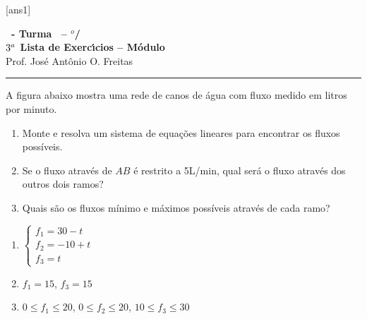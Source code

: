 \documentclass[12pt]{exam}
\begin{document}
  [ans1]
  \begin{center}
    {\Large\bf \disciplina\ - Turma \turma\ -- \semestre$^{o}$/\ano} \\ \vspace{9pt} {\large\bf
        $3^a$ Lista de Exerc{\'\i}cios -- Módulo \numeromodulo}\\ \vspace{9pt} Prof. Jos{\'e} Ant{\^o}nio O. Freitas
  \end{center}
  \hrule


\begin{exercicio}
  A figura abaixo mostra uma rede de canos de água com fluxo medido em litros por minuto.
  
  \begin{enumerate}
    \item Monte e resolva um sistema de equações lineares para encontrar os fluxos possíveis.
    \item Se o fluxo através de $AB$ é restrito a 5L/min, qual será o fluxo através dos outros dois ramos?
    \item Quais são os fluxos mínimo e máximos possíveis através de cada ramo?
  \end{enumerate}
  \begin{solucao}
    \begin{enumerate}
      \item $\begin{cases}f_1 = 30 - t\\f_2 = -10 + t\\f_3 = t\end{cases}$
      \item $f_1 = 15$, $f_3 = 15$
      \item $0 \le f_1 \le 20$, $0 \le f_2 \le 20$, $10 \le f_3 \le 30$
    \end{enumerate}
  \end{solucao}
\end{exercicio}
\end{document}
